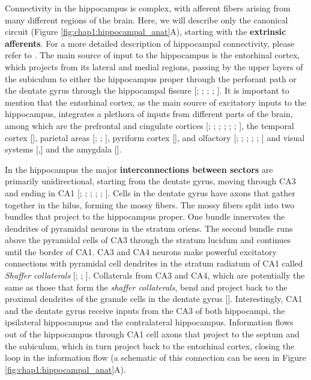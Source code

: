 Connectivity in the hippocampus is complex, with afferent fibers arising from many different regions of the brain. 
Here, we will describe only the canonical circuit (Figure \ref{fig:chap1:hippocampal_anat}A), starting with the \textbf{extrinsic afferents}. 
For a more detailed description of hippocampal connectivity, please refer to \cite{okeefebook}.
The main source of input to the hippocampus is the entorhinal cortex, which projects from its lateral and medial regions, passing by the upper layers of the subiculum to either the hippocampus proper through the perforant path or the dentate gyrus through the hippocampal fissure [\cite{nafstad1967}; \cite{hjorth1972}; \cite{vanhoesen1972}; \cite{hjorth1973}; \cite{vanhoesen1975b}].
It is important to mention that the entorhinal cortex, as the main source of excitatory inputs to the hippocampus, integrates a plethora of inputs from different parts of the brain, among which are the prefrontal and cingulate cortices [\cite{adey1951}; \cite{adeymeyer1952}; \cite{white1959}; \cite{cragg1965}; \cite{raisman1965}; \cite{mclardy1971}; \cite{leichnetz1975}], the temporal cortex [\cite{cragg1965}], parietal areas [\cite{pandya1969}; \cite{pandyavignolo1969}; \cite{petras1971}], pyriform cortex [\cite{powell1965}], and olfactory [\cite{cragg1960}; \cite{cragg1961}; \cite{heimer1968}; \cite{white1965}; \cite{price1971}; \cite{kerr1972}] and visual systems [\cite{casey1965},\cite{cuenod1965}] and the amygdala [\cite{krettek1974}].

In the hippocampus the major \textbf{interconnections between sectors} are primarily unidirectional, starting from the dentate gyrus, moving through CA3 and ending in CA1 [\cite{lorente1934}; \cite{raisman1965}; \cite{hjorth1973}; \cite{andersen1966}; \cite{fujita1962}; \cite{gloorverasperti1963}].   
Cells in the dentate gyrus have axons that gather together in the hilus, forming the mossy fibers. 
The mossy fibers split into two bundles that project to the hippocampus proper. 
One bundle innervates the dendrites of pyramidal neurons in the stratum oriens.
The second bundle runs above the pyramidal cells of CA3 through the stratum lucidum and continues until the border of CA1.
CA3 and CA4 neurons make powerful excitatory connections with pyramidal cell dendrites in the stratum radiatum of CA1 called \textit{Shaffer collaterals} [\cite{lorente1934}; \cite{hjorth1973}; \cite{andersen1966}]. 
Collaterals from CA3 and CA4, which are potentially the same as those that form the \textit{shaffer collaterals}, bend and project back to the proximal dendrites of the granule cells in the dentate gyrus [\cite{zimmer1971}].
Interestingly, CA1 and the dentate gyrus receive inputs from the CA3 of both hippocampi, the ipsilateral hippocampus and the contralateral hippocampus.
Information flows out of the hippocampus through CA1 cell axons that project to the septum and the subiculum, which in turn project back to the entorhinal cortex, closing the loop in the information flow (a schematic of this connection can be seen in Figure \ref{fig:chap1:hippocampal_anat}A).

